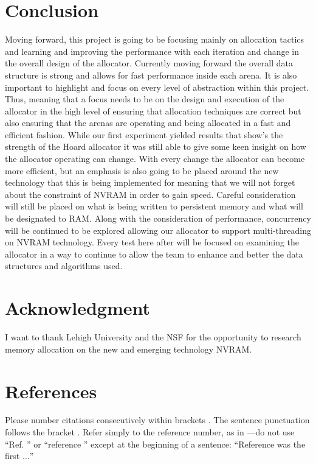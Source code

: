 \documentclass[conference]{IEEEtran}
\begin{document}
\section{Conclusion}
Moving forward, this project is going to be focusing mainly on allocation tactics and learning and improving the performance with each iteration and change in the overall design of the allocator. Currently moving forward the overall data structure is strong and allows for fast performance inside each arena. It is also important to highlight and focus on every level of abstraction within this project. Thus, meaning that a focus needs to be on the design and execution of the allocator in the high level of ensuring that allocation techniques are correct but also ensuring that the arenas are operating and being allocated in a fast and efficient fashion. While our first experiment yielded results that show’s the strength of the Hoard allocator it was still able to give some keen insight on how the allocator operating can change. With every change the allocator can become more efficient, but an emphasis is also going to be placed around the new technology that this is being implemented for meaning that we will not forget about the constraint of NVRAM in order to gain speed. Careful consideration will still be placed on what is being written to persistent memory and what will be designated to RAM. Along with the consideration of performance, concurrency will be continued to be explored allowing our allocator to support multi-threading on NVRAM technology. Every test here after will be focused on examining the allocator in a way to continue to allow the team to enhance and better the data structures and algorithms used. 

\section{Acknowledgment}

I want to thank Lehigh University and the NSF for the opportunity to research memory allocation on the new and emerging technology NVRAM.  

\section{References}

Please number citations consecutively within brackets \cite{IEEEhowto:IEEEtranpage}. The 
sentence punctuation follows the bracket \cite{b2}. Refer simply to the reference 
number, as in \cite{b3}---do not use ``Ref. \cite{b3}'' or ``reference \cite{b3}'' except at 
the beginning of a sentence: ``Reference \cite{b3} was the first $\ldots$''
\end{document}

